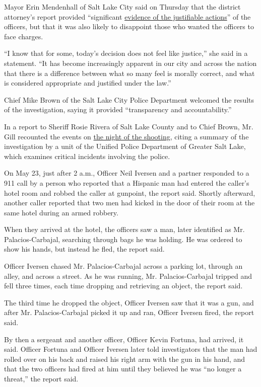 Mayor Erin Mendenhall of Salt Lake City said on Thursday that the
district attorney's report provided ``significant
\href{https://twitter.com/slcmayor/status/1281321341975588864}{evidence
of the justifiable actions}'' of the officers, but that it was also
likely to disappoint those who wanted the officers to face charges.

``I know that for some, today's decision does not feel like justice,''
she said in a statement. ``It has become increasingly apparent in our
city and across the nation that there is a difference between what so
many feel is morally correct, and what is considered appropriate and
justified under the law.''

Chief Mike Brown of the Salt Lake City Police Department welcomed the
results of the investigation, saying it provided ``transparency and
accountability.''

In a report to Sheriff Rosie Rivera of Salt Lake County and to Chief
Brown, Mr. Gill recounted the events on
\href{https://slco.org/contentassets/932acae5b89840fb943984301a4d5aad/noreplyslcounty.com_20200709_074341.pdf}{the
night of the shooting}, citing a summary of the investigation by a unit
of the Unified Police Department of Greater Salt Lake, which examines
critical incidents involving the police.

On May 23, just after 2 a.m., Officer Neil Iversen and a partner
responded to a 911 call by a person who reported that a Hispanic man had
entered the caller's hotel room and robbed the caller at gunpoint, the
report said. Shortly afterward, another caller reported that two men had
kicked in the door of their room at the same hotel during an armed
robbery.

When they arrived at the hotel, the officers saw a man, later identified
as Mr. Palacios-Carbajal, searching through bags he was holding. He was
ordered to show his hands, but instead he fled, the report said.

Officer Iversen chased Mr. Palacios-Carbajal across a parking lot,
through an alley, and across a street. As he was running, Mr.
Palacios-Carbajal tripped and fell three times, each time dropping and
retrieving an object, the report said.

The third time he dropped the object, Officer Iversen saw that it was a
gun, and after Mr. Palacios-Carbajal picked it up and ran, Officer
Iversen fired, the report said.

By then a sergeant and another officer, Officer Kevin Fortuna, had
arrived, it said. Officer Fortuna and Officer Iversen later told
investigators that the man had rolled over on his back and raised his
right arm with the gun in his hand, and that the two officers had fired
at him until they believed he was ``no longer a threat,'' the report
said.

